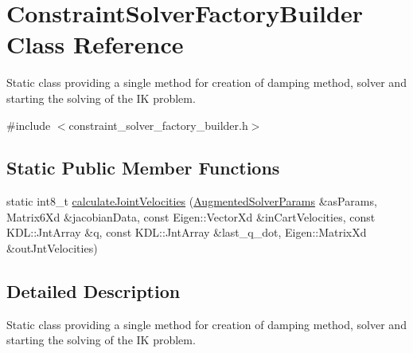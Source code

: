 \hypertarget{classConstraintSolverFactoryBuilder}{\section{Constraint\-Solver\-Factory\-Builder Class Reference}
\label{classConstraintSolverFactoryBuilder}
}


Static class providing a single method for creation of damping method, solver and starting the solving of the I\-K problem.  




{\ttfamily \#include $<$constraint\-\_\-solver\-\_\-factory\-\_\-builder.\-h$>$}

\subsection*{Static Public Member Functions}
\begin{DoxyCompactItemize}
\item 
static int8\-\_\-t \hyperlink{classConstraintSolverFactoryBuilder_a1d2eb736030aeea9156a20031d14e48a}{calculate\-Joint\-Velocities} (\hyperlink{structAugmentedSolverParams}{Augmented\-Solver\-Params} \&as\-Params, Matrix6\-Xd \&jacobian\-Data, const Eigen\-::\-Vector\-Xd \&in\-Cart\-Velocities, const K\-D\-L\-::\-Jnt\-Array \&q, const K\-D\-L\-::\-Jnt\-Array \&last\-\_\-q\-\_\-dot, Eigen\-::\-Matrix\-Xd \&out\-Jnt\-Velocities)
\end{DoxyCompactItemize}


\subsection{Detailed Description}
Static class providing a single method for creation of damping method, solver and starting the solving of the I\-K problem. 

